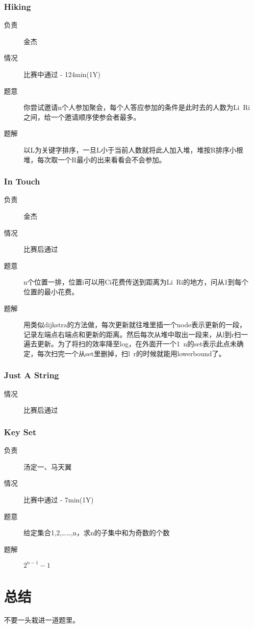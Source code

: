 \documentclass[a4paper, 11pt, nofonts, nocap, fancyhdr]{ctexart}
\newcommand{\problem}[1]{\subsubsection{#1}}
\begin{document}
\problem{Hiking}

\begin{description}
\item[负责] 金杰
\item[情况] 比赛中通过 - 124min(1Y)
\item[题意]
你尝试邀请n个人参加聚会，每个人答应参加的条件是此时去的人数为Li~Ri之间，给一个邀请顺序使参会者最多。
\item[题解]
以L为关键字排序，一旦L小于当前人数就将此人加入堆，堆按R排序小根堆，每次取一个R最小的出来看看会不会参加。
\end{description}

\problem{In Touch}

\begin{description}
\item[负责] 金杰
\item[情况] 比赛后通过
\item[题意]
n个位置一排，位置i可以用Ci花费传送到距离为Li~Ri的地方，问从1到每个位置的最小花费。
\item[题解]
用类似dijkstra的方法做，每次更新就往堆里插一个node表示更新的一段，记录左端点右端点和更新的距离。然后每次从堆中取出一段来，从l到r扫一遍去更新。为了将扫的效率降至log，在外面开一个1~n的set表示此点未确定，每次扫完一个从set里删掉，扫l~r的时候就能用lowerbound了。
\end{description}

\problem{Just A String}

\begin{description}
\item[情况] 比赛后通过
\end{description}

\problem{Key Set}

\begin{description}
\item[负责]汤定一、马天翼
\item[情况] 比赛中通过 - 7min(1Y)
\item[题意]
给定集合{1,2,……,n}，求n的子集中和为奇数的个数
\item[题解]
$2^{n-1}-1$
\end{description}

\section{总结}

不要一头栽进一道题里。
\end{document}
